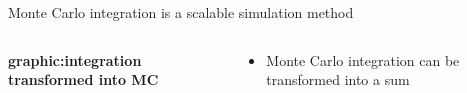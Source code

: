 \autobookmark
\begin{frame}{Monte Carlo integration is a scalable simulation method}
  \begin{columns}[T]

    \begin{column}{.5\textwidth}
      \textbf{graphic:integration transformed into MC}
    \end{column}

    \begin{column}{.5\textwidth}
      \begin{itemize}
        \item Monte Carlo integration can be transformed into a sum
      \end{itemize}
    \end{column}

  \end{columns}
\end{frame}


